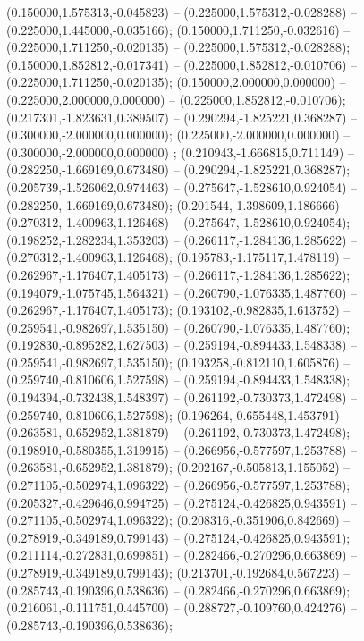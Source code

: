  (0.150000,1.575313,-0.045823) -- (0.225000,1.575312,-0.028288) -- (0.225000,1.445000,-0.035166);
 (0.150000,1.711250,-0.032616) -- (0.225000,1.711250,-0.020135) -- (0.225000,1.575312,-0.028288);
 (0.150000,1.852812,-0.017341) -- (0.225000,1.852812,-0.010706) -- (0.225000,1.711250,-0.020135);
 (0.150000,2.000000,0.000000) -- (0.225000,2.000000,0.000000) -- (0.225000,1.852812,-0.010706);
 (0.217301,-1.823631,0.389507) -- (0.290294,-1.825221,0.368287) -- (0.300000,-2.000000,0.000000);
 (0.225000,-2.000000,0.000000) -- (0.300000,-2.000000,0.000000) ;
 (0.210943,-1.666815,0.711149) -- (0.282250,-1.669169,0.673480) -- (0.290294,-1.825221,0.368287);
 (0.205739,-1.526062,0.974463) -- (0.275647,-1.528610,0.924054) -- (0.282250,-1.669169,0.673480);
 (0.201544,-1.398609,1.186666) -- (0.270312,-1.400963,1.126468) -- (0.275647,-1.528610,0.924054);
 (0.198252,-1.282234,1.353203) -- (0.266117,-1.284136,1.285622) -- (0.270312,-1.400963,1.126468);
 (0.195783,-1.175117,1.478119) -- (0.262967,-1.176407,1.405173) -- (0.266117,-1.284136,1.285622);
 (0.194079,-1.075745,1.564321) -- (0.260790,-1.076335,1.487760) -- (0.262967,-1.176407,1.405173);
 (0.193102,-0.982835,1.613752) -- (0.259541,-0.982697,1.535150) -- (0.260790,-1.076335,1.487760);
 (0.192830,-0.895282,1.627503) -- (0.259194,-0.894433,1.548338) -- (0.259541,-0.982697,1.535150);
 (0.193258,-0.812110,1.605876) -- (0.259740,-0.810606,1.527598) -- (0.259194,-0.894433,1.548338);
 (0.194394,-0.732438,1.548397) -- (0.261192,-0.730373,1.472498) -- (0.259740,-0.810606,1.527598);
 (0.196264,-0.655448,1.453791) -- (0.263581,-0.652952,1.381879) -- (0.261192,-0.730373,1.472498);
 (0.198910,-0.580355,1.319915) -- (0.266956,-0.577597,1.253788) -- (0.263581,-0.652952,1.381879);
 (0.202167,-0.505813,1.155052) -- (0.271105,-0.502974,1.096322) -- (0.266956,-0.577597,1.253788);
 (0.205327,-0.429646,0.994725) -- (0.275124,-0.426825,0.943591) -- (0.271105,-0.502974,1.096322);
 (0.208316,-0.351906,0.842669) -- (0.278919,-0.349189,0.799143) -- (0.275124,-0.426825,0.943591);
 (0.211114,-0.272831,0.699851) -- (0.282466,-0.270296,0.663869) -- (0.278919,-0.349189,0.799143);
 (0.213701,-0.192684,0.567223) -- (0.285743,-0.190396,0.538636) -- (0.282466,-0.270296,0.663869);
 (0.216061,-0.111751,0.445700) -- (0.288727,-0.109760,0.424276) -- (0.285743,-0.190396,0.538636);
